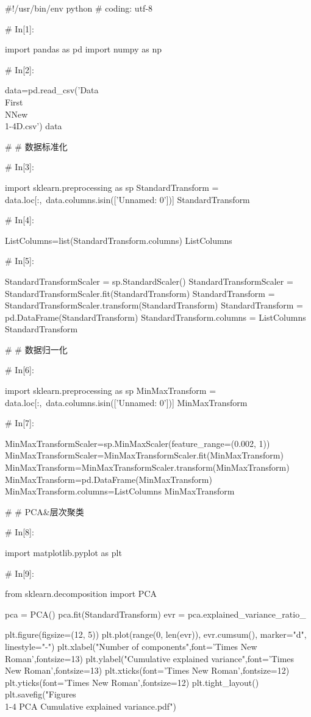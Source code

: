 \documentclass{MathorCupModeling}
\begin{document}
\begin{python}
#!/usr/bin/env python
# coding: utf-8

# In[1]:


import pandas as pd
import numpy as np


# In[2]:


data=pd.read_csv('Data\\First\\NNew\\1-4D.csv')
data


# # 数据标准化

# In[3]:


import sklearn.preprocessing as sp
StandardTransform = data.loc[:,~data.columns.isin(['Unnamed: 0'])]
StandardTransform


# In[4]:


ListColumns=list(StandardTransform.columns)
ListColumns


# In[5]:


StandardTransformScaler = sp.StandardScaler()
StandardTransformScaler = StandardTransformScaler.fit(StandardTransform)
StandardTransform = StandardTransformScaler.transform(StandardTransform)
StandardTransform = pd.DataFrame(StandardTransform)
StandardTransform.columns = ListColumns
StandardTransform


# # 数据归一化

# In[6]:


import sklearn.preprocessing as sp
MinMaxTransform = data.loc[:,~data.columns.isin(['Unnamed: 0'])]
MinMaxTransform


# In[7]:


MinMaxTransformScaler=sp.MinMaxScaler(feature_range=(0.002, 1))
MinMaxTransformScaler=MinMaxTransformScaler.fit(MinMaxTransform)
MinMaxTransform=MinMaxTransformScaler.transform(MinMaxTransform)
MinMaxTransform=pd.DataFrame(MinMaxTransform)
MinMaxTransform.columns=ListColumns
MinMaxTransform


# # PCA&层次聚类

# In[8]:


import matplotlib.pyplot as plt


# In[9]:


from sklearn.decomposition import PCA

pca = PCA()
pca.fit(StandardTransform)
evr = pca.explained_variance_ratio_

plt.figure(figsize=(12, 5))
plt.plot(range(0, len(evr)), evr.cumsum(), marker="d", linestyle="-")
plt.xlabel("Number of components",font='Times New Roman',fontsize=13)
plt.ylabel("Cumulative explained variance",font='Times New Roman',fontsize=13)
plt.xticks(font='Times New Roman',fontsize=12)
plt.yticks(font='Times New Roman',fontsize=12)
plt.tight_layout()
plt.savefig("Figures\\1-4 PCA Cumulative explained variance.pdf")



\end{python}
\end{document}
